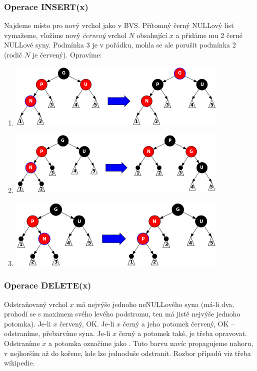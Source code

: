 \documentclass[11pt]{report} %
\numberwithin{equation}{section}
\begin{document}
\subsubsection{Operace INSERT(x)}
Najdeme místo pro nový vrchol jako v BVS. Přítomný černý NULLový list vymažeme, vložíme nový \textit{červený} vrchol $N$ obsahující $x$ a přidáme mu 2 černé NULLové syny. Podmínka 3 je v pořádku, mohla se ale porušit podmínka 2 (rodič $N$ je červený). Opravíme:
\begin{enumerate}
	
	\item \qquad \includegraphics[scale=0.7]{img/rb_ins1.png}
	\item \qquad \includegraphics[scale=0.7]{img/rb_ins2.png}
	\item \qquad \includegraphics[scale=0.7]{img/rb_ins3.png}
\end{enumerate}


\subsubsection{Operace DELETE(x)}
Odstraňovaný vrchol $x$ má nejvýše jednoho neNULLového syna (má-li dva, prohodí se s maximem svého levého podstromu, ten má jistě nejvýše jednoho potomka). Je-li $x$ červený, OK. Je-li $x$ černý a jeho potomek červený, OK -- odstraníme, přebarvíme syna. Je-li $x$ černý a potomek také, je třeba opravovat. Odstraníme $x$ a potomka označíme jako . Tuto barvu navíc propagujeme nahoru, v nejhorším až do kořene, kde lze jednoduše odstranit. Rozbor případů viz třeba wikipedie.
\end{document}
